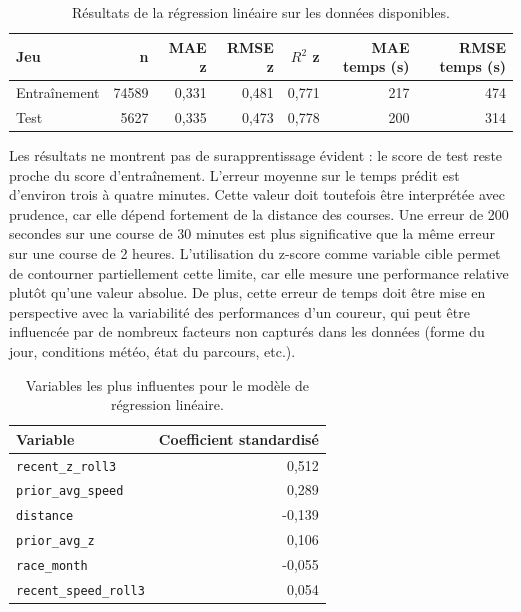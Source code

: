 \documentclass[12pt,a4paper]{article}
\begin{document}
\begin{table}[h!]
    \centering
    \begin{tabular}{lrrrrrr}
        \toprule
        Jeu & n & MAE z & RMSE z & $R^2$ z & MAE temps (s) & RMSE temps (s) \\
        \midrule
        Entraînement & 74589 & 0,331 & 0,481 & 0,771 & 217 & 474 \\
        Test & 5627 & 0,335 & 0,473 & 0,778 & 200 & 314 \\
        \bottomrule
    \end{tabular}
    \caption{Résultats de la régression linéaire sur les données disponibles.}
    \label{tab:regression-resultats}
\end{table}

Les résultats ne montrent pas de surapprentissage évident : le score de test reste proche du score d'entraînement. L'erreur moyenne sur le temps prédit est d'environ trois à quatre minutes. Cette valeur doit toutefois être interprétée avec prudence, car elle dépend fortement de la distance des courses. Une erreur de 200 secondes sur une course de 30 minutes est plus significative que la même erreur sur une course de 2 heures. L'utilisation du z-score comme variable cible permet de contourner partiellement cette limite, car elle mesure une performance relative plutôt qu'une valeur absolue. De plus, cette erreur de temps doit être mise en perspective avec la variabilité des performances d'un coureur, qui peut être influencée par de nombreux facteurs non capturés dans les données (forme du jour, conditions météo, état du parcours, etc.).

\begin{table}[h!]
    \centering
    \begin{tabular}{lr}
        \toprule
        Variable & Coefficient standardisé \\
        \midrule
        \texttt{recent\_z\_roll3} & 0,512 \\
        \texttt{prior\_avg\_speed} & 0,289 \\
        \texttt{distance} & -0,139 \\
        \texttt{prior\_avg\_z} & 0,106 \\
        \texttt{race\_month} & -0,055 \\
        \texttt{recent\_speed\_roll3} & 0,054 \\
        \bottomrule
    \end{tabular}
    \caption{Variables les plus influentes pour le modèle de régression linéaire.}
    \label{tab:variables-regression}
\end{table}
\end{document}
